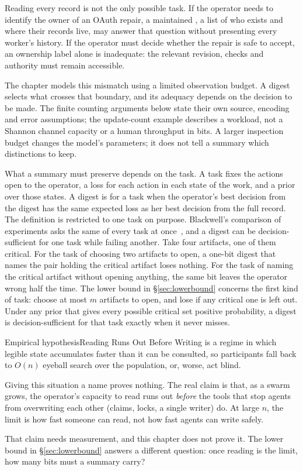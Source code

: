 \documentclass[11pt,a4paper]{article}
\theoremstyle{definition}
\theoremstyle{plain}
\begin{document}
Reading every record is not the only possible task. If the operator needs to
identify the owner of an OAuth repair, a maintained , a list of
who exists and where their records live, may answer that
question without presenting every worker's history. If the operator must decide
whether the repair is safe to accept, an ownership label alone is inadequate:
the relevant revision, checks and authority must remain accessible.

The chapter models this mismatch using a limited observation budget. A digest
selects what crosses that boundary, and its adequacy depends on the decision
to be made. The finite counting arguments below state their own source,
encoding and error assumptions; the update-count example describes a workload,
not a Shannon channel capacity or a human throughput in bits. A larger
inspection budget changes the model's parameters; it does not tell a summary
which distinctions to keep.

What a summary must preserve depends on the task. A task fixes the actions
open to the operator, a loss for each action in each state of the work, and a
prior over those states. A digest is  for a task when
the operator's best decision from the digest has the same expected loss as her
best decision from the full record. The definition is restricted to one task on
purpose. Blackwell's comparison of experiments asks the same of every task at
once~, and a digest can be decision-sufficient for one task
while failing another. Take four artifacts, one of them critical. For the task of
choosing two artifacts to open, a one-bit digest that names the pair holding the
critical artifact loses nothing. For the task of naming the critical artifact
without opening anything, the same bit leaves the operator wrong half the time.
The lower bound in \S\ref{sec:lowerbound} concerns the first kind of task:
choose at most $m$ artifacts to open, and lose if any critical one is left out.
Under any prior that gives every possible critical set positive probability, a
digest is decision-sufficient for that task exactly when it never misses.

\begin{pdclaim}{Empirical hypothesis}{Reading Runs Out Before Writing}
\setlength{\parskip}{4pt plus 1pt}
\label{def:readpoverty}
 is a regime in which legible state accumulates faster than it
can be consulted, so participants fall back to $O(n)$ eyeball search over the
population, or, worse, act blind.

Giving this situation a name proves nothing. The real claim is that, as a
swarm grows, the operator's capacity to read runs out \emph{before} the tools
that stop agents from overwriting each other (claims, locks, a single writer)
do. At large $n$, the limit is how fast someone can read, not how fast agents
can write safely.

That claim needs measurement, and this chapter does not prove it. The lower
bound in \S\ref{sec:lowerbound} answers a different question: once reading is
the limit, how many bits must a summary carry?
\end{pdclaim}
\end{document}
